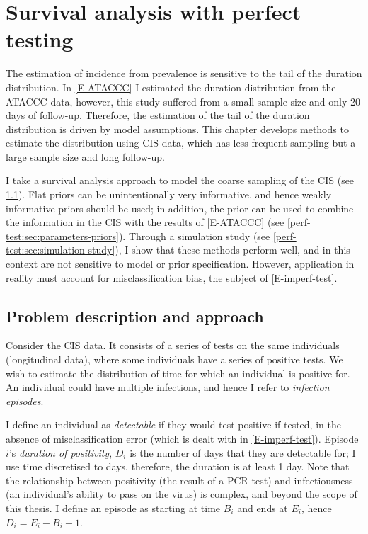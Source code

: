 \documentclass[thesis.tex]{subfiles}
\begin{document}
\chapter{Survival analysis with perfect testing} \label{perf-test}

The estimation of incidence from prevalence is sensitive to the tail of the duration distribution.
In \cref{E-ATACCC} I estimated the duration distribution from the ATACCC data, however, this study suffered from a small sample size and only 20 days of follow-up.
Therefore, the estimation of the tail of the duration distribution is driven by model assumptions.
This chapter develops methods to estimate the distribution using CIS data, which has less frequent sampling but a large sample size and long follow-up.

I take a survival analysis approach to model the coarse sampling of the CIS (see \cref{perf-test:sec:problem}).
Flat priors can be unintentionally very informative, and hence weakly informative priors should be used; in addition, the prior can be used to combine the information in the CIS with the results of \cref{E-ATACCC} (see \cref{perf-test:sec:parameters-priors}).
Through a simulation study (see \cref{perf-test:sec:simulation-study}), I show that these methods perform well, and in this context are not sensitive to model or prior specification.
However, application in reality must account for misclassification bias, the subject of \cref{E-imperf-test}.


\section{Problem description and approach} \label{perf-test:sec:problem}

Consider the CIS data.
It consists of a series of tests on the same individuals (longitudinal data), where some individuals have a series of positive tests.
We wish to estimate the distribution of time for which an individual is positive for.
An individual could have multiple infections, and hence I refer to \emph{infection episodes}.

I define an individual as \emph{detectable} if they would test positive if tested, in the absence of misclassification error (which is dealt with in \cref{E-imperf-test}).
Episode $i$'s \emph{duration of positivity}, $D_i$ is the number of days that they are detectable for; I use time discretised to days, therefore, the duration is at least 1 day.
Note that the relationship between positivity (\ie the result of a PCR test) and infectiousness (\ie an individual's ability to pass on the virus) is complex,  and beyond the scope of this thesis.
I define an episode as starting at time $B_i$ and ends at $E_i$, hence $D_i = E_i - B_i + 1$.
\end{document}
